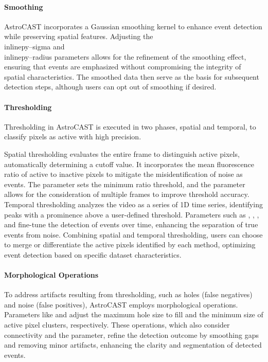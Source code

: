 \paragraph{Smoothing}
AstroCAST incorporates a Gaussian smoothing kernel to enhance event detection while preserving spatial features.
Adjusting the \\inlinepy{--sigma} and \\inlinepy{--radius} parameters allows for
the refinement of the smoothing effect, ensuring that events are emphasized without compromising the integrity of
spatial characteristics. The smoothed data then serve as the basis for subsequent detection steps, although users can
opt out of smoothing if desired.

\paragraph{Thresholding}
Thresholding in AstroCAST is executed in two phases, spatial and temporal, to classify pixels as active with high
precision.

Spatial thresholding evaluates the entire frame to distinguish active pixels, automatically determining a cutoff value. It incorporates the mean fluorescence ratio of active to inactive pixels to mitigate the misidentification of noise as events. The  parameter sets the minimum ratio threshold, and the  parameter allows for the consideration of multiple frames to improve threshold accuracy. Temporal thresholding analyzes the video as a series of 1D time series, identifying peaks with a prominence above a user-defined threshold. Parameters such as ,  , , and  fine-tune the detection of events over time, enhancing the separation of true events from noise. Combining spatial and temporal thresholding, users can choose to merge or differentiate the active pixels identified by each method, optimizing event detection based on specific dataset characteristics.

\paragraph{Morphological Operations}
To address artifacts resulting from thresholding, such as holes (false negatives) and noise (false positives), AstroCAST employs morphological operations. Parameters like  and  adjust the maximum hole size to fill and the minimum size of active pixel clusters, respectively. These operations, which also consider connectivity and the  parameter, refine the detection outcome by smoothing gaps and removing minor artifacts, enhancing the clarity and segmentation of detected events.


